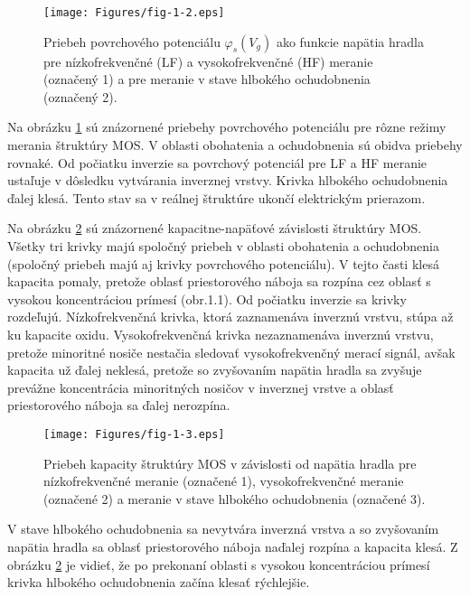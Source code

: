\begin{figure}[h!]\centering
\texttt{[image: Figures/fig-1-2.eps]}
\captionsetup{justification=raggedright, singlelinecheck=false}
\caption[Priebeh povrchového potenciálu $\varphi_s(V_g)$ ako funkcie
  napätia hradla]{Priebeh povrchového potenciálu $\varphi_s(V_g)$ ako
  funkcie napätia hradla pre nízkofrekvenčné (LF) a vysokofrekvenčné
  (HF) meranie (označený 1) a pre meranie v stave hlbokého
  ochudobnenia (označený 2).}
\label{fig:1.2}
\end{figure}

\par Na obrázku \ref{fig:1.2} sú znázornené priebehy povrchového
potenciálu pre rôzne režimy merania štruktúry MOS. V oblasti
obohatenia a ochudobnenia sú obidva priebehy rovnaké. Od počiatku
inverzie sa povrchový potenciál pre LF a HF meranie ustaľuje v
dôsledku vytvárania inverznej vrstvy.  Krivka hlbokého ochudobnenia
ďalej klesá. Tento stav sa v reálnej štruktúre ukončí elektrickým
prierazom.

\par Na obrázku \ref{fig:1.3} sú znázornené kapacitne-napäťové
závislosti štruktúry MOS. Všetky tri krivky majú spoločný priebeh v
oblasti obohatenia a ochudobnenia (spoločný priebeh majú aj krivky
povrchového potenciálu). V tejto časti klesá kapacita pomaly, pretože
oblasť priestorového náboja sa rozpína cez oblasť s vysokou
koncentráciou prímesí (obr.1.1). Od počiatku inverzie sa krivky
rozdeľujú. Nízkofrekvenčná krivka, ktorá zaznamenáva inverznú vrstvu,
stúpa až ku kapacite oxidu. Vysokofrekvenčná krivka nezaznamenáva
inverznú vrstvu, pretože minoritné nosiče nestačia sledovať
vysokofrekvenčný merací signál, avšak kapacita už ďalej neklesá,
pretože so zvyšovaním napätia hradla sa zvyšuje prevážne koncentrácia
minoritných nosičov v inverznej vrstve a oblasť priestorového náboja
sa ďalej nerozpína.

\begin{figure}[h!]\centering
\texttt{[image: Figures/fig-1-3.eps]}
\captionsetup{justification=raggedright, singlelinecheck=false}
\caption[Priebeh kapacity štruktúry MOS v závislosti od napätia
  hradla]{Priebeh kapacity štruktúry MOS v závislosti od napätia
  hradla pre nízkofrekvenčné meranie (označené 1), vysokofrekvenčné
  meranie (označené 2) a meranie v stave hlbokého ochudobnenia
  (označené 3).}
\label{fig:1.3}
\end{figure}

\par V stave hlbokého ochudobnenia sa nevytvára inverzná vrstva a so
zvyšovaním napätia hradla sa oblasť priestorového náboja naďalej
rozpína a kapacita klesá. Z obrázku \ref{fig:1.3} je vidieť, že po
prekonaní oblasti s vysokou koncentráciou prímesí krivka hlbokého
ochudobnenia začína klesať rýchlejšie.

